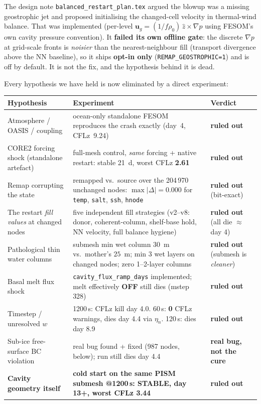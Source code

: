 \documentclass[11pt,a4paper]{article}
\newcommand{\code}[1]{\texttt{\small #1}}
\begin{document}
The design note \code{balanced\_restart\_plan.tex} argued the blowup was a missing geostrophic
jet and proposed initialising the changed-cell velocity in thermal-wind balance. That was
implemented (per-level $\mathbf{u}_g = (1/f\rho_0)\,\hat{z}\times\nabla p$ using FESOM's own
cavity pressure convention). It \textbf{failed its own offline gate}: the discrete $\nabla p$ at
grid-scale fronts is \emph{noisier} than the nearest-neighbour fill (transport divergence above
the NN baseline), so it ships \textbf{opt-in only} (\code{REMAP\_GEOSTROPHIC=1}) and is off by
default. It is not the fix, and the hypothesis behind it is dead.

Every hypothesis we have held is now eliminated by a direct experiment:

\begin{longtable}{@{}p{5.0cm}p{6.6cm}p{3.4cm}@{}}
\toprule
\textbf{Hypothesis} & \textbf{Experiment} & \textbf{Verdict} \\
\midrule
\endhead
Atmosphere / OASIS / coupling & ocean-only standalone FESOM reproduces the crash exactly
  (day~4, CFLz~9.24) & \textbf{ruled out} \\
CORE2 forcing shock (standalone artefact) & full-mesh control, \emph{same} forcing + native
  restart: stable 21~d, worst CFLz \textbf{2.61} & \textbf{ruled out} \\
Remap corrupting the state & remapped vs.\ source over the 204\,970 unchanged nodes:
  $\max|\Delta| = \mathbf{0.000}$ for \code{temp}, \code{salt}, \code{ssh}, \code{hnode} &
  \textbf{ruled out} (bit-exact) \\
The restart \emph{fill values} at changed nodes & five independent fill strategies
  (v2--v8: donor, coherent-column, shelf-base hold, NN velocity, full balance hygiene) &
  \textbf{ruled out} (all die $\approx$day 4) \\
Pathological thin water columns & submesh min wet column $30$~m vs.\ mother's $25$~m;
  min 3 wet layers on changed nodes; zero 1--2-layer columns & \textbf{ruled out}
  (submesh is \emph{cleaner}) \\
Basal melt flux shock & \code{cavity\_flux\_ramp\_days} implemented; melt effectively
  \textbf{OFF} still dies (mstep 328) & \textbf{ruled out} \\
Timestep / unresolved $w$ & 1200\,s: CFLz kill day 4.0. 60\,s: \textbf{0} CFLz warnings, dies
  day 4.4 via $\eta_n$. 120\,s: dies day 8.9 & \textbf{ruled out} \\
Sub-ice free-surface BC violation & real bug found + fixed (987 nodes, below); run still
  dies day 4.4 & \textbf{real bug, not the cure} \\
\textbf{Cavity geometry itself} & \textbf{cold start on the same PISM submesh @1200\,s:
  STABLE, day 13+, worst CFLz 3.44} & \textbf{ruled out} \\
\bottomrule
\end{longtable}
\end{document}
